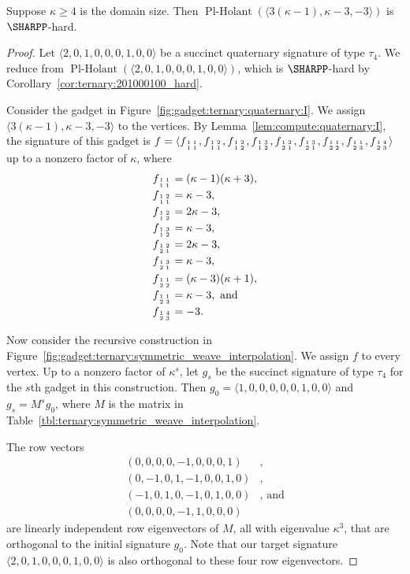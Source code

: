 \documentclass[11pt]{article}
\newcommand{\PlHolant}{\operatorname{Pl-Holant}}
\newcommand{\subMat}[4]{\mbox{\scriptsize $\begin{smallmatrix} #1 & #4 \\ #2 & #3 \end{smallmatrix}$}}
\begin{document}
\begin{lemma} \label{lem:ternary:3k-1k-3-3_hard_k>3}
 Suppose $\kappa \ge 4$ is the domain size.
 Then $\PlHolant(\langle 3 (\kappa - 1), \kappa - 3, -3 \rangle)$ is $\SHARPP$-hard.
\end{lemma}

\begin{proof}
 Let $\langle 2,0,1,0,0,0,1,0,0 \rangle$ be a succinct quaternary signature of type $\tau_4$.
 We reduce from $\PlHolant(\langle 2,0,1,0,0,0,1,0,0 \rangle)$,
 which is $\SHARPP$-hard by Corollary~\ref{cor:ternary:201000100_hard}.
 
 Consider the gadget in Figure~\ref{fig:gadget:ternary:quaternary:I}.
 We assign $\langle 3 (\kappa - 1), \kappa - 3, -3 \rangle$ to the vertices.
 By Lemma~\ref{lem:compute:quaternary:I},
 the signature of this gadget is
 $f =
 \langle
  f_{\subMat{1}{1}{1}{1}},
  f_{\subMat{1}{1}{1}{2}},
  f_{\subMat{1}{1}{2}{2}},
  f_{\subMat{1}{1}{2}{3}},
  f_{\subMat{1}{2}{1}{2}},
  f_{\subMat{1}{2}{1}{3}},
  f_{\subMat{1}{2}{2}{1}},
  f_{\subMat{1}{2}{3}{1}},
  f_{\subMat{1}{2}{3}{4}}
 \rangle$ up to a nonzero factor of $\kappa$,
 where
 \begin{align*}
  f_{\subMat{1}{1}{1}{1}} &= (\kappa - 1) (\kappa + 3),\\
  f_{\subMat{1}{1}{1}{2}} &= \kappa - 3,\\
  f_{\subMat{1}{1}{2}{2}} &= 2 \kappa - 3,\\
  f_{\subMat{1}{1}{2}{3}} &= \kappa - 3,\\
  f_{\subMat{1}{2}{1}{2}} &= 2 \kappa - 3,\\
  f_{\subMat{1}{2}{1}{3}} &= \kappa - 3,\\
  f_{\subMat{1}{2}{2}{1}} &= (\kappa - 3) (\kappa + 1),\\
  f_{\subMat{1}{2}{3}{1}} &= \kappa - 3, \text{ and}\\
  f_{\subMat{1}{2}{3}{4}} &= -3.
 \end{align*}
 
 Now consider the recursive construction in Figure~\ref{fig:gadget:ternary:symmetric_weave_interpolation}.
 We assign $f$ to every vertex.
 Up to a nonzero factor of $\kappa^s$,
 let $g_s$ be the succinct signature of type $\tau_4$ for the $s$th gadget in this construction.
 Then $g_0 = \langle 1,0,0,0,0,0,1,0,0 \rangle$ and $g_s = M^s g_0$,
 where $M$ is the matrix in Table~\ref{tbl:ternary:symmetric_weave_interpolation}.
 
 The row vectors
 \begin{align*}
  ( 0, 0,0,0,-1,0,0,0,1)&,\\
  ( 0,-1,0,1,-1,0,0,1,0)&,\\
  (-1, 0,1,0,-1,0,1,0,0)&, \text{ and}\\
  ( 0, 0,0,0,-1,1,0,0,0)&
 \end{align*}
 are linearly independent row eigenvectors of $M$,
 all with eigenvalue $\kappa^3$,
 that are orthogonal to the initial signature $g_0$.
 Note that our target signature $\langle 2, 0, 1, 0, 0, 0, 1, 0, 0 \rangle$ is also orthogonal to these four row eigenvectors.
 

\end{proof}
\end{document}
